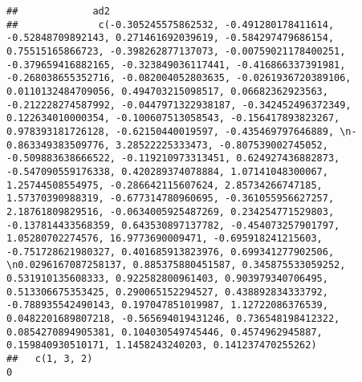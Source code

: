 \documentclass[
  11pt,
]{article}
\begin{document}
\begin{verbatim}
##             ad2
##              c(-0.305245575862532, -0.491280178411614, -0.52848709892143, 0.271461692039619, -0.584297479686154, 0.75515165866723, -0.398262877137073, -0.00759021178400251, -0.379659416882165, -0.323849036117441, -0.416866337391981, -0.268038655352716, -0.082004052803635, -0.0261936720389106, 0.0110132484709056, 0.494703215098517, 0.06682362923563, -0.212228274587992, -0.0447971322938187, -0.342452496372349, 0.122634010000354, -0.100607513058543, -0.156417893823267, 0.978393181726128, -0.62150440019597, -0.435469797646889, \n-0.863349383509776, 3.28522225333473, -0.807539002745052, -0.509883638666522, -0.119210973313451, 0.624927436882873, -0.547090559176338, 0.420289374078884, 1.07141048300067, 1.25744508554975, -0.286642115607624, 2.85734266747185, 1.57370390988319, -0.677314780960695, -0.361055956627257, 2.18761809829516, -0.0634005925487269, 0.234254771529803, -0.137814433568359, 0.643530897137782, -0.454073257901797, 1.05280702274576, 16.9773690009471, -0.695918241215603, -0.751728621980327, 0.401685913823976, 0.699341277902506, \n0.0296167087258137, 0.885375880451587, 0.345875533059252, 0.531910135608333, 0.922582800961403, 0.903979340706495, 0.513306675353425, 0.290065152294527, 0.438892834333792, -0.788935542490143, 0.197047851019987, 1.12722086376539, 0.0482201689807218, -0.565694019431246, 0.736548198412322, 0.0854270894905381, 0.104030549745446, 0.4574962945887, 0.159840930510171, 1.1458243240203, 0.141237470255262)
##   c(1, 3, 2)                                                                                                                                                                                                                                                                                                                                                                                                                                                                                                                                                                                                                                                                                                                                                                                                                                                                                                                                                                                                                                                                                                                                                                                                                                                                                                                                                                                                                                                                                             0
\end{verbatim}
\end{document}
